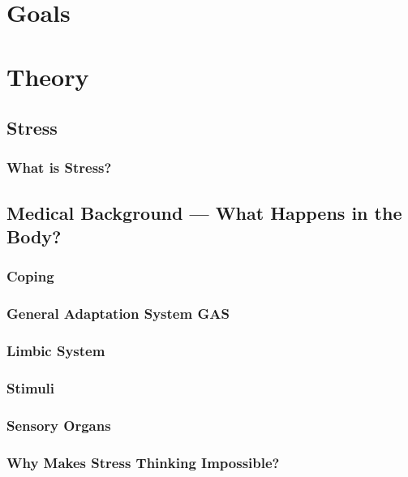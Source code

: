 \documentclass[../main.tex]{subfiles}
\begin{document}
\chapter{Goals}
\chapter{Theory}
\section{Stress}
\subsection{What is Stress?}

\section{Medical Background --- What Happens in the Body?}


\subsection{Coping}


\subsection{General Adaptation System GAS}


\subsection{Limbic System}

\subsection{Stimuli}

\subsection{Sensory Organs}

\subsection{Why Makes Stress Thinking Impossible?}

\end{document}
